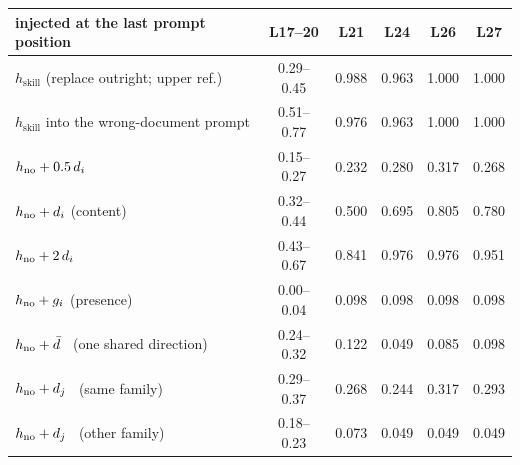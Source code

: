 \begin{tabular}{lccccc}
\toprule
\rowcolor{TableHeader}
injected at the last prompt position & L17--20 & L21 & L24 & L26 & L27\\
\midrule
$h_{\text{skill}}$ (replace outright; upper ref.) & 0.29--0.45 & 0.988 & 0.963 & 1.000 & 1.000 \\
$h_{\text{skill}}$ into the wrong-document prompt & 0.51--0.77 & 0.976 & 0.963 & 1.000 & 1.000 \\
\midrule
$h_{\text{no}} + 0.5\,d_i$ & 0.15--0.27 & 0.232 & 0.280 & 0.317 & 0.268 \\
$h_{\text{no}} + d_i$ \quad (content) & 0.32--0.44 & 0.500 & 0.695 & 0.805 & 0.780 \\
$h_{\text{no}} + 2\,d_i$ & 0.43--0.67 & 0.841 & 0.976 & 0.976 & 0.951 \\
\midrule
$h_{\text{no}} + g_i$ \quad (presence) & 0.00--0.04 & 0.098 & 0.098 & 0.098 & 0.098 \\
$h_{\text{no}} + \bar{d}$ \ (one shared direction) & 0.24--0.32 & 0.122 & 0.049 & 0.085 & 0.098 \\
$h_{\text{no}} + d_j$ \ (same family) & 0.29--0.37 & 0.268 & 0.244 & 0.317 & 0.293 \\
$h_{\text{no}} + d_j$ \ (other family) & 0.18--0.23 & 0.073 & 0.049 & 0.049 & 0.049 \\
\bottomrule
\end{tabular}
